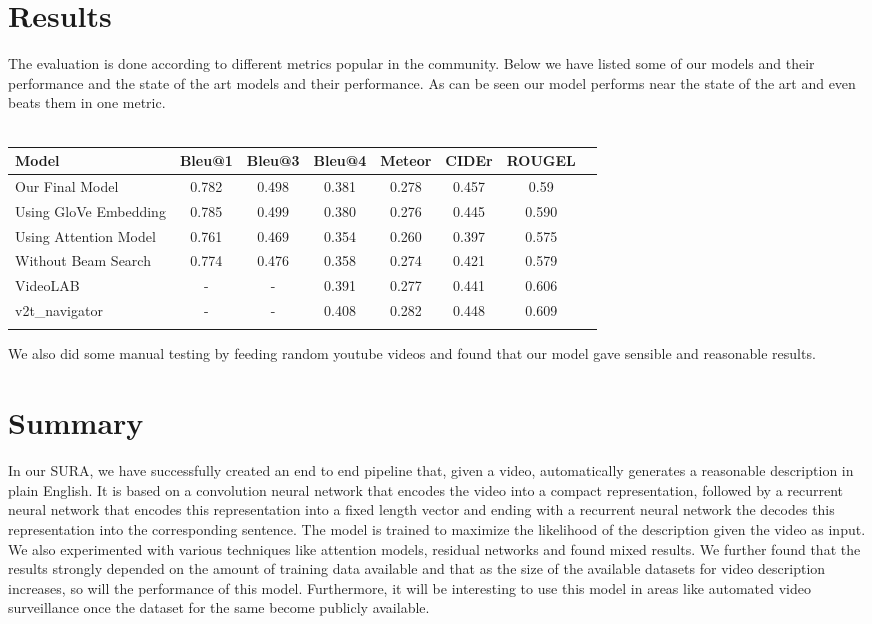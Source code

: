 \documentclass[12pt]{article}
\begin{document}
\section{Results}

The evaluation is done according to different metrics popular in the community. Below we have listed some of our models and their performance and the state of the art models and their performance. As can be seen our model performs near the state of the art and even beats them in one metric.\\\\
\begin{tabular}{l*{6}{|c|}r}
Model              & Bleu@1 & Bleu@3 & Bleu@4 & Meteor &  CIDEr & ROUGEL \\
\hline
Our Final Model & 0.782 & 0.498 & 0.381 & 0.278 & 0.457 & 0.59  \\
Using GloVe Embedding         & 0.785 & 0.499 & 0.380 &  0.276 & 0.445 &  0.590 \\
Using Attention Model           & 0.761  & 0.469 & 0.354 &  0.260 & 0.397 &  0.575  \\
Without Beam Search     & 0.774 & 0.476 & 0.358 &  0.274 & 0.421 &  0.579  \\
\hline
VideoLAB     & -  & - & 0.391 &  0.277 & 0.441 &  0.606  \\
v2t\_navigator     & - & - & 0.408 &  0.282 & 0.448 &  0.609  \\
\hline \\
\end{tabular}

We also did some manual testing by feeding random youtube videos and found that our model gave sensible and reasonable results.

\section{Summary}
	In our SURA, we have successfully created an end to end pipeline that, given a video, automatically
	generates a reasonable description in plain English. It is based on a convolution neural network that
	encodes the video into a compact representation, followed by a recurrent neural network that encodes
	this representation into a fixed length vector and ending with a recurrent neural network the decodes this
	representation into the corresponding sentence. The model is trained to maximize the likelihood of the description
	given the video as input. We also experimented with various techniques like attention models, residual networks and 
	found mixed results. We further found that the results strongly depended on the amount of training data available and
	that as the size of the available datasets for video description increases, so will the performance of this model.
	Furthermore, it will be interesting to use this model in areas like automated video surveillance once the dataset
	for the same become publicly available.
\end{document}
